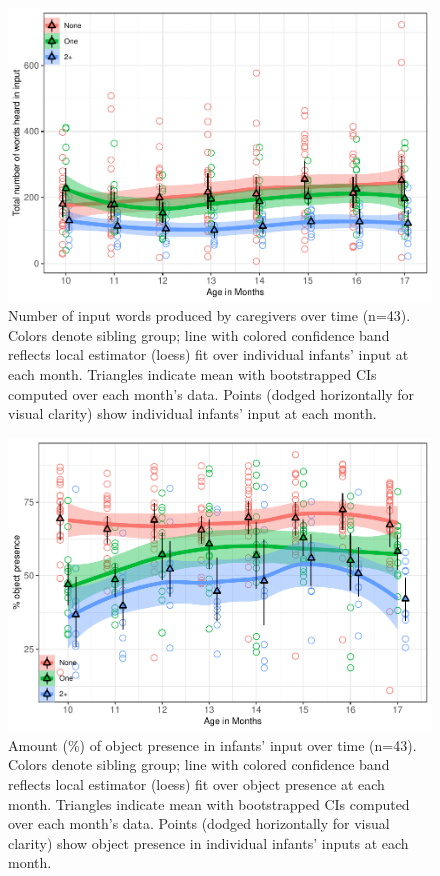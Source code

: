 \documentclass[
  man,mask,floatsintext]{apa6}
\begin{document}
\begin{figure}
\centering
\includegraphics{SiblingsStudy_SupplementaryData-anon-revisions_files/figure-latex/Figure-input-age-1.pdf}
\caption{\label{fig:Figure-input-age}Number of input words produced by caregivers over time (n=43). Colors denote sibling group; line with colored confidence band reflects local estimator (loess) fit over individual infants' input at each month. Triangles indicate mean with bootstrapped CIs computed over each month's data. Points (dodged horizontally for visual clarity) show individual infants' input at each month.}
\end{figure}

\begin{figure}
\centering
\includegraphics{SiblingsStudy_SupplementaryData-anon-revisions_files/figure-latex/Figure-OP-age-1.pdf}
\caption{\label{fig:Figure-OP-age}Amount (\%) of object presence in infants' input over time (n=43). Colors denote sibling group; line with colored confidence band reflects local estimator (loess) fit over object presence at each month. Triangles indicate mean with bootstrapped CIs computed over each month's data. Points (dodged horizontally for visual clarity) show object presence in individual infants' inputs at each month.}
\end{figure}
\end{document}
